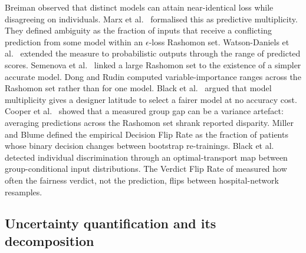 \documentclass[acmsmall,nonacm,review,anonymous]{acmart}
\newcommand{\1}[1]{\mathbf{1}\!\left\{#1\right\}}
\begin{document}
Breiman \cite{breiman2001statistical} observed that distinct models can attain near-identical loss while disagreeing on individuals. Marx et al.\ \cite{marx2020} formalised this as predictive multiplicity. They defined ambiguity as the fraction of inputs that receive a conflicting prediction from some model within an $\epsilon$-loss Rashomon set. Watson-Daniels et al.\ \cite{watson2023} extended the measure to probabilistic outputs through the range of predicted scores. Semenova et al.\ \cite{semenova2022} linked a large Rashomon set to the existence of a simpler accurate model. Dong and Rudin \cite{dong2020} computed variable-importance ranges across the Rashomon set rather than for one model. Black et al.\ \cite{black2022} argued that model multiplicity gives a designer latitude to select a fairer model at no accuracy cost. Cooper et al.\ \cite{cooper2024} showed that a measured group gap can be a variance artefact: averaging predictions across the Rashomon set shrank reported disparity. Miller and Blume \cite{miller2024edfr} defined the empirical Decision Flip Rate as the fraction of patients whose binary decision changes between bootstrap re-trainings. Black et al.\ \cite{black2021selective} detected individual discrimination through an optimal-transport map between group-conditional input distributions. The Verdict Flip Rate of \cite{joy2025vfr} measured how often the fairness verdict, not the prediction, flips between hospital-network resamples.

\subsection{Uncertainty quantification and its decomposition}
\end{document}
